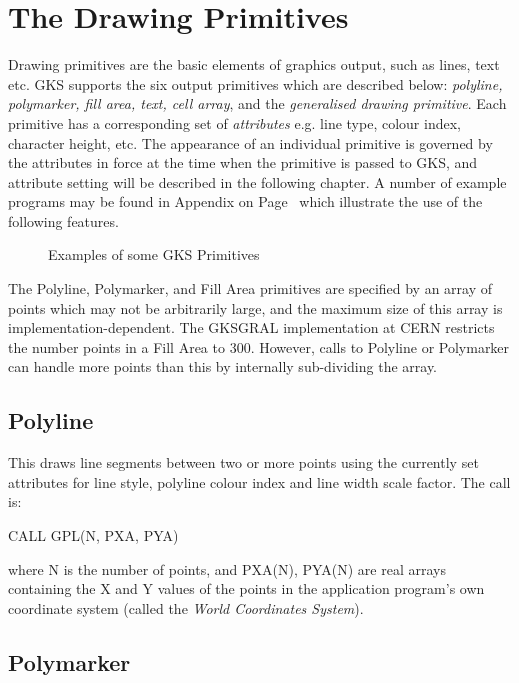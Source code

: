 \section{\protect\label{sec:dprim}The Drawing Primitives}
 
Drawing primitives are the basic elements of graphics output, such as
lines, text etc.
GKS supports the six output primitives which are described below:
{\it polyline, polymarker, fill area, text, cell array},
and the {\it generalised drawing primitive}.
Each primitive has a corresponding set of {\it attributes}
e.g. line type, colour index, character height, etc.
The appearance of an individual primitive is governed by the
attributes in force at the time when the primitive is passed to GKS,
and attribute setting will be described in the following chapter.
A number of example programs may be found in Appendix on Page~\pageref{sec:exmpref}
which illustrate the use of the following features.
\begin{figure}[h]
\caption{Examples of some GKS Primitives}
\label{fig:prims}
\end{figure}
\begin{note}
The Polyline, Polymarker, and Fill Area primitives are specified by an
array of points which may not be arbitrarily large, and the maximum
size of this array is implementation-dependent. The GKSGRAL
implementation at CERN restricts the number points in a Fill Area to
300. However, calls to Polyline or Polymarker can handle more points
than this by internally sub-dividing the array.
\end{note}
\subsection{Polyline}
 
This draws line segments between two or more points using the
currently set attributes for line style, polyline colour index and
line width scale factor. The call is:
\begin{XMP}
CALL GPL(N, PXA, PYA)
\end{XMP}
where N is the number of points, and PXA(N), PYA(N) are real
arrays containing the X and Y values of the points in the
application program's own coordinate system (called the
{\it World Coordinates System}).
\subsection{Polymarker}
 
